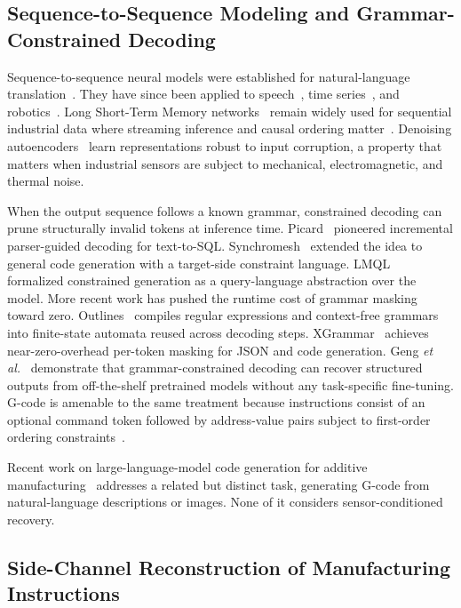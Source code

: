 \documentclass[sensors,article,submit,moreauthors,pdftex]{Definitions/mdpi}
\newcommand{\etal}{\textit{et al.}}
\begin{document}
\subsection{Sequence-to-Sequence Modeling and Grammar-Constrained Decoding}
\label{sec:related-seq2seq}

Sequence-to-sequence neural models were established for natural-language translation~\cite{sutskever2014sequence,bahdanau2014neural,vaswani2017attention}. They have since been applied to speech~\cite{graves2013speech}, time series~\cite{wen2023transformers}, and robotics~\cite{robotics_s2s}. Long Short-Term Memory networks~\cite{hochreiter1997long} remain widely used for sequential industrial data where streaming inference and causal ordering matter~\cite{malhotra2015lstm}. Denoising autoencoders~\cite{vincent2010stacked} learn representations robust to input corruption, a property that matters when industrial sensors are subject to mechanical, electromagnetic, and thermal noise.

When the output sequence follows a known grammar, constrained decoding can prune structurally invalid tokens at inference time. Picard~\cite{picard} pioneered incremental parser-guided decoding for text-to-SQL. Synchromesh~\cite{synchromesh} extended the idea to general code generation with a target-side constraint language. LMQL~\cite{lmql} formalized constrained generation as a query-language abstraction over the model. More recent work has pushed the runtime cost of grammar masking toward zero. Outlines~\cite{outlines} compiles regular expressions and context-free grammars into finite-state automata reused across decoding steps. XGrammar~\cite{xgrammar} achieves near-zero-overhead per-token masking for JSON and code generation. Geng \etal~\cite{geng2023gcd} demonstrate that grammar-constrained decoding can recover structured outputs from off-the-shelf pretrained models without any task-specific fine-tuning. G-code is amenable to the same treatment because instructions consist of an optional command token followed by address-value pairs subject to first-order ordering constraints~\cite{grammar_paper,gcode_foundational}.

Recent work on large-language-model code generation for additive manufacturing~\cite{gllm,image2gcode,chatcnc} addresses a related but distinct task, generating G-code from natural-language descriptions or images. None of it considers sensor-conditioned recovery.

\subsection{Side-Channel Reconstruction of Manufacturing Instructions}
\label{sec:related-sidechan}
\end{document}

